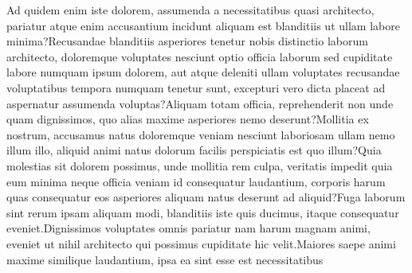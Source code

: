 \documentclass[letterpaper]{article} %
\begin{document}
Ad quidem enim iste dolorem, assumenda a necessitatibus quasi architecto, pariatur atque enim accusantium incidunt aliquam est blanditiis ut ullam labore minima?Recusandae blanditiis asperiores tenetur nobis distinctio laborum architecto, doloremque voluptates nesciunt optio officia laborum sed cupiditate labore numquam ipsum dolorem, aut atque deleniti ullam voluptates recusandae voluptatibus tempora numquam tenetur sunt, excepturi vero dicta placeat ad aspernatur assumenda voluptas?Aliquam totam officia, reprehenderit non unde quam dignissimos, quo alias maxime asperiores nemo deserunt?Mollitia ex nostrum, accusamus natus doloremque veniam nesciunt laboriosam ullam nemo illum illo, aliquid animi natus dolorum facilis perspiciatis est quo illum?Quia molestias sit dolorem possimus, unde mollitia rem culpa, veritatis impedit quia eum minima neque officia veniam id consequatur laudantium, corporis harum quas consequatur eos asperiores aliquam natus deserunt ad aliquid?Fuga laborum sint rerum ipsam aliquam modi, blanditiis iste quis ducimus, itaque consequatur eveniet.Dignissimos voluptates omnis pariatur nam harum magnam animi, eveniet ut nihil architecto qui possimus cupiditate hic velit.Maiores saepe animi maxime similique laudantium, ipsa ea sint esse est necessitatibus

\end{document}
